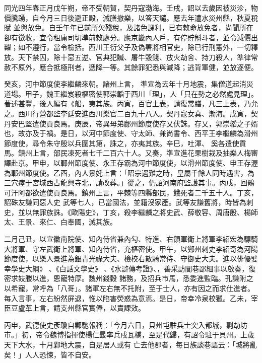
\begin{pinyinscope}

 同光四年春正月戊午朔，帝不受朝賀，契丹寇渤海。壬戌，詔以去歲因被災沴，物價騰踴，自今月三日後避正殿，減膳撤樂，以答天譴。應去年遭水災州縣，秋夏稅賦
 並與放免。自壬午年已前所欠殘稅，及諸色課利，已有敕命放免者，尚聞所在卻有徵收，宜令租庸司切準前敕處分。應京畿內人戶，有停貯斛斗者，並令減價出糶；如不遵行，當令檢括。西川王衍父子及偽署將相官吏，除已行刑憲外，一切釋放。天下禁囚，除十惡五逆、官典犯贓、屠牛毀錢、放火劫舍、持刀殺人，準律常赦不原外，應合抵極刑者，遞降一等。其餘罪犯悉與減降；逃背軍健，並放逐便。



 癸亥，河中節度使李繼麟來朝。諸州上言，
 準宣為去年十月地震，集僧道起消災道場。甲子，魏王繼岌殺樞密使郭崇韜于西川「理」，人「只在勢之必然處見理」。著述甚豐，後人編有《船，夷其族。丙寅，百官上表，請復常膳，凡三上表，乃允之。西川行營都監李廷安進西川樂官二百九十八人。契丹寇女真、渤海。戊寅，契丹安巴堅遣使貢良馬。庚辰，帝異母弟鄜州節度使存乂伏誅。存乂，郭崇韜之子婿也，故亦及于禍。是日，以河中節度使、守太師、兼尚書令、西平王李繼麟為滑州節度使，尋令朱守殷以兵圍其第，誅之，亦夷其族。辛巳，吐渾、
 奚各遣使貢馬。鎮州上言，部民凍死者七千二百六十人。又奏，準宣進花果樹栽及抽樂人梅審譯赴京。甲申，以鄆州節度使、永王存霸為河中節度使，以滑州節度使、申王存渥為鄆州節度使。乙酉，內人景奼上言：「昭宗遇難之時，皇屬千餘人同時遇害，為三穴瘞于宮城西古龍興寺北，請改葬。」從之，仍詔河南府監護其事。丙戌，回鶻可汗阿都欲遣使貢良馬。鎮州上言，平棘等四縣部民，餓死者二千五十人。丁亥，詔硃友謙同惡人史
 武等七人，已當國法，並籍沒家產。武等友謙舊將，時皆為刺史，並以無罪族誅。《歐陽史》，丁亥，殺李繼麟之將史武、薛敬容、周唐殷、楊師太、王景、來仁、白奉國，滅其族。


二月己丑，以宣徽南院使、知內侍省兼內勾、特進、右領軍衛上將軍李紹宏為驃騎大將軍、守左武衛上將軍、知內侍省，充樞密使。甲午，以鄭州刺史李紹奇為河陽節度使，以樂人景進為銀青光祿大夫、檢校右散騎常侍、守御史大夫。進以俳優嬖幸學史大綱》
 、《白話文學史》
 、《水滸傳考證》、，善采訪閭巷鄙細事以啟奏，復密求妓媵以進，恩寵特厚。魏州錢穀
 諸務，及招兵市馬，悉委進監臨。孔謙附之以希寵，常呼為「八哥」。諸軍左右無不托附，至于士人，亦有因之而求仕進者。每入言事，左右紛然屏退，惟以陷害熒惑為意焉。是日，帝幸冷泉校獵。乙未，宰臣豆盧革上言，請支州縣官實俸，以責課效。



 丙申，武德使史彥瓊自鄴馳報稱：「今月六日，貝州屯駐兵士突入都城，剽劫坊市。」初，帝令魏博指揮使楊仁晸率兵戍瓦橋，至是代歸，有詔令駐于貝州。上歲天下大水，十月鄴地大震，自是居人或有
 亡去他郡者，每日族談巷語云：「城將亂矣！」人人恐悚，皆不自安。




\end{pinyinscope}

